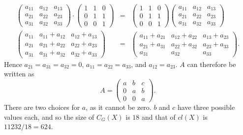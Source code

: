 \documentclass[11pt]{article} \usepackage{amssymb}
\begin{document}
\begin{enumerate}
\begin{enumerate}
\begin{itemize}
        \begin{eqnarray*}
          \begin{pmatrix}
            a_{11}&a_{12}  &a_{13} \\ 
            a_{21}&a_{22}  &a_{23} \\ 
            a_{31}&a_{32}  &a_{33} 
          \end{pmatrix}
          \cdot
          \begin{pmatrix}
            1&1  &0 \\ 
            0&1  &1 \\ 
            0&0  &1 
          \end{pmatrix}
          &=&
          \begin{pmatrix}
            1&1  &0 \\ 
            0&1  &1 \\ 
            0&0  &1 
          \end{pmatrix}
          \begin{pmatrix}
            a_{11}&a_{12}  &a_{13} \\ 
            a_{21}&a_{22}  &a_{23} \\ 
            a_{31}&a_{32}  &a_{33} 
          \end{pmatrix}
          \\
          \begin{pmatrix}
            a_{11}&a_{11}+a_{12}  &a_{12}+a_{13} \\ 
            a_{21}&a_{21}+a_{22}  &a_{22}+a_{23} \\ 
            a_{31}&a_{31}+a_{32}  &a_{32}+a_{33} 
          \end{pmatrix}
          &=&
          \begin{pmatrix}
            a_{11}+a_{21}&a_{12}+a_{22}  &a_{13}+a_{23} \\ 
            a_{21}+a_{31}&a_{22}+a_{32}  &a_{23}+a_{33} \\ 
            a_{31}&a_{32}  &a_{33} 
          \end{pmatrix}.
        \end{eqnarray*}
        Hence $a_{21}=a_{31}=a_{32}=0$, $a_{11}=a_{22}=a_{33}$, and $a_{12}=a_{23}$. 
        $A$ can therefore be written as
        \begin{equation*}
          A=
          \begin{pmatrix}
            a &b  &c \\ 
            0 &a  &b \\ 
            0 &0  &a 
          \end{pmatrix}.
        \end{equation*}
        There are two choices for $a$, as it cannot be zero. $b$ and $c$ have
        three possible values each, and so the size of $C_G(X)$ is $18$
        and that of $cl(X)$ is $11232/18=624$.
        

\end{itemize}
\end{enumerate}
\end{enumerate}
\end{document}
